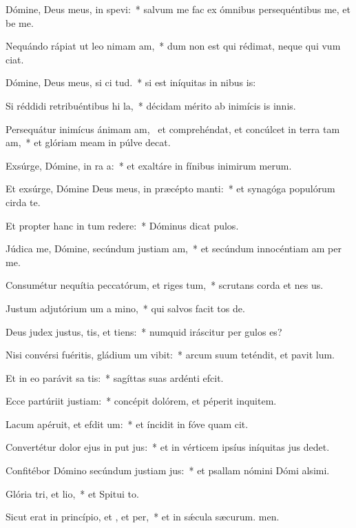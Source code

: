 \item Dómine, Deus meus, in  spevi:~* salvum me fac ex ómnibus persequéntibus me, et be me.
\item Nequándo rápiat ut leo nimam am,~* dum non est qui rédimat, neque qui vum ciat.
\item Dómine, Deus meus, si ci tud.~* si est iníquitas in nibus is:
\item Si réddidi retribuéntibus hi la,~* décidam mérito ab inimícis is innis.
\item Persequátur inimícus ánimam am,~\pscross{} et comprehéndat, et concúlcet in terra tam am,~* et glóriam meam in púlve decat.
\item Exsúrge, Dómine, in ra a:~* et exaltáre in fínibus inimirum merum.
\item Et exsúrge, Dómine Deus meus, in præcépto  manti:~* et synagóga populórum cirda te.
\item Et propter hanc in tum redere:~* Dóminus dicat pulos.
\item Júdica me, Dómine, secúndum justiam am,~* et secúndum innocéntiam am per me.
\item Consumétur nequítia peccatórum, et riges tum,~* scrutans corda et nes us.
\item Justum adjutórium um a mino,~* qui salvos facit tos de.
\item Deus judex justus, tis, et tiens:~* numquid iráscitur per gulos es?
\item Nisi convérsi fuéritis, gládium um vibit:~* arcum suum teténdit, et pavit lum.
\item Et in eo parávit sa tis:~* sagíttas suas ardénti efcit.
\item Ecce partúriit justiam:~* concépit dolórem, et péperit inquitem.
\item Lacum apéruit, et efdit um:~* et íncidit in fóve quam cit.
\item Convertétur dolor ejus in put jus:~* et in vérticem ipsíus iníquitas jus dedet.
\item Confitébor Dómino secúndum justiam jus:~* et psallam nómini Dómi alsimi.
\item Glória tri, et lio,~* et Spitui to.
\item Sicut erat in princípio, et , et per,~* et in sǽcula sæcurum. men.
